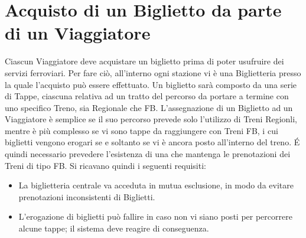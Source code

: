 \section{Acquisto di un Biglietto da parte di un Viaggiatore}

Ciascun Viaggiatore deve acquistare un biglietto prima di poter usufruire dei servizi ferroviari. Per fare ciò, all'interno ogni stazione vi è una Biglietteria presso la quale l'acquisto può essere effettuato. Un biglietto sarà composto da una serie di Tappe, ciascuna relativa ad un tratto del percorso da portare a termine con uno specifico Treno, sia Regionale che FB. 
L'assegnazione di un Biglietto ad un Viaggiatore è semplice se il suo percorso prevede solo l'utilizzo di Treni Regionli, mentre è più complesso se vi sono tappe da raggiungere con Treni FB, i cui biglietti vengono erogari se e soltanto se vi è ancora posto all'interno del treno.
\'E quindi necessario prevedere l'esistenza di una  che mantenga le prenotazioni dei Treni di tipo FB. Si ricavano quindi i seguenti requisiti:
	\begin{itemize}
		\item La biglietteria centrale va acceduta in mutua esclusione, in modo da evitare prenotazioni inconsistenti di Biglietti.
		\item L'erogazione di biglietti può fallire in caso non vi siano posti per percorrere alcune tappe; il sistema deve reagire di conseguenza.
	\end{itemize}

